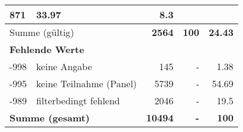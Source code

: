 \begin{longtable}{lXrrr}
       \num{871} &
       \num[round-mode=places,round-precision=2]{33,97} &
         \num[round-mode=places,round-precision=2]{8,3} \\
     \midrule
     \multicolumn{2}{l}{Summe (gültig)} &
       \textbf{\num{2564}} &
     \textbf{100} &
       \textbf{\num[round-mode=places,round-precision=2]{24,43}} \\
     \multicolumn{5}{l}{\textbf{Fehlende Werte}}\\
       -998 &
       keine Angabe &
         \num{145} &
        - &
         \num[round-mode=places,round-precision=2]{1,38} \\
       -995 &
       keine Teilnahme (Panel) &
         \num{5739} &
        - &
         \num[round-mode=places,round-precision=2]{54,69} \\
       -989 &
       filterbedingt fehlend &
         \num{2046} &
        - &
         \num[round-mode=places,round-precision=2]{19,5} \\
     \midrule
     \multicolumn{2}{l}{\textbf{Summe (gesamt)}} &
          \textbf{\num{10494}} &
        \textbf{-} &
        \textbf{100} \\
     \bottomrule
     \end{longtable}
     
